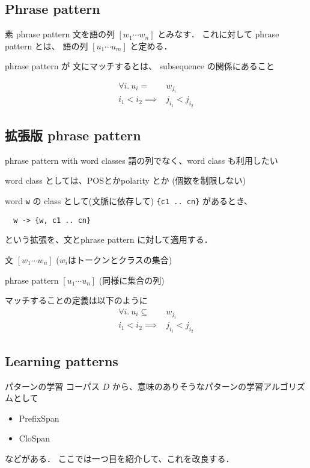 \documentclass[12pt, dvipdfmx, default, cjk]{beamer}
\begin{document}
\subsection{Phrase pattern}

\begin{frame}{素 phrase pattern}
  文を語の列 $[w_1 \cdots w_n]$ とみなす．
  これに対して phrase pattern とは、
  語の列
  $[u_1 \cdots u_m]$
  と定める．

  phrase pattern が 文にマッチするとは、
  subsequence の関係にあること

  \begin{align*}
    \forall i . ~ u_i = & w_{j_i} \\
    i_1 < i_2 \implies & j_{i_1} < j_{i_2}
  \end{align*}

\end{frame}

\subsection{拡張版 phrase pattern}

\begin{frame}[fragile]{phrase pattern with word classes}
  語の列でなく、word class も利用したい

  word class としては、POSとかpolarity とか
  (個数を制限しない)

  word \texttt{w} の
  class として(文脈に依存して) \texttt{\{c1 .. cn\}} があるとき、

  \begin{verbatim}
  w -> {w, c1 .. cn}
  \end{verbatim}

  という拡張を、文とphrase pattern に対して適用する．
\end{frame}

\begin{frame}
  文 $[w_1 \cdots w_n]$ ($w_i$はトークンとクラスの集合)

  phrase pattern $[u_1 \cdots u_n]$ (同様に集合の列)

  マッチすることの定義は以下のように
  \begin{align*}
    \forall i . ~ u_i \subseteq & w_{j_i} \\
    i_1 < i_2 \implies & j_{i_1} < j_{i_2}
  \end{align*}
\end{frame}

\subsection{Learning patterns}
\begin{frame}{パターンの学習}
  コーパス $D$ から、意味のありそうなパターンの学習アルゴリズムとして
  \begin{itemize}
    \item PrefixSpan
    \item CloSpan
  \end{itemize}
  などがある．
  ここでは一つ目を紹介して、これを改良する．
\end{frame}
\end{document}
